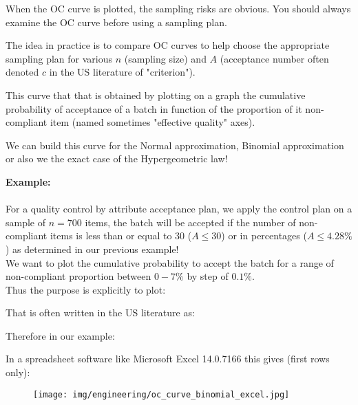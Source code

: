 	When the OC curve is plotted, the sampling risks are obvious. You should always examine the OC curve before using a sampling plan.

	The idea in practice is to compare OC curves to help choose the appropriate sampling plan for various $n$ (sampling size) and $A$ (acceptance number often denoted $c$ in the US literature of "criterion").
	
	This curve that that is obtained by plotting on a graph the cumulative probability of acceptance of a batch in function of the proportion of it non-compliant item (named sometimes "effective quality" axes).

	We can build this curve for the Normal approximation, Binomial approximation or also we the exact case of the Hypergeometric law!
	
	\begin{tcolorbox}[colframe=black,colback=white,sharp corners]
	\textbf{{\Large {}}Example:}\\\\
	For a quality control by attribute acceptance plan, we apply the control plan on a sample of $n=700$ items, the batch will be accepted if the number of non-compliant items is less than or equal to $30$ ($A\leq 30$) or in percentages ($A\leq 4.28\%$) as determined in our previous example!\\

	We want to plot the cumulative probability to accept the batch for a range of non-compliant proportion between $0-7\%$ by step of $0.1\%$.\\
	
	Thus the purpose is explicitly to plot:
	
	That is often written in the US literature as:
	
	Therefore in our example:
	
	In a spreadsheet software like Microsoft Excel 14.0.7166 this gives (first rows only):
	\begin{figure}[H]
		\centering
		\texttt{[image: img/engineering/oc\_curve\_binomial\_excel.jpg]}
	\end{figure}
	\end{tcolorbox}
	
